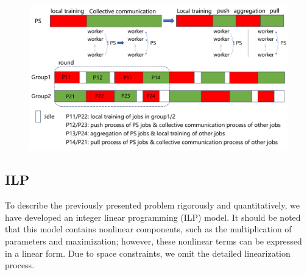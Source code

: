 \documentclass[conference]{IEEEtran}
\begin{document}
\begin{figure}
	\centering
	\includegraphics[width=1\linewidth]{figure/picture6}
	\caption{}
	\label{fig:picture6}
\end{figure}

\subsection{ILP}


To describe the previously presented problem rigorously and quantitatively, we have developed an integer linear programming (ILP) model. It should be noted that this model contains nonlinear components, such as the multiplication of parameters and maximization; however, these nonlinear terms can be expressed in a linear form. Due to space constraints, we omit the detailed linearization process.
\end{document}
